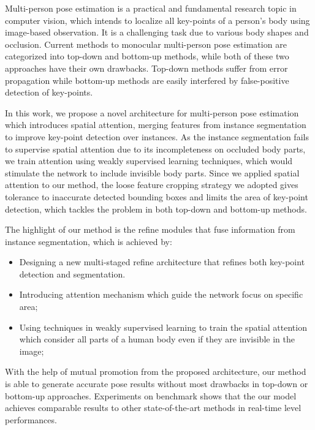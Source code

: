 \begin{eabstract}
Multi-person pose estimation is a practical and fundamental research topic in computer vision, which intends to localize all key-points of a person's body using image-based observation. It is a challenging task due to various body shapes and occlusion. Current methods to monocular multi-person pose estimation are categorized into top-down and bottom-up methods, while both of these two approaches have their own drawbacks. Top-down methods suffer from error propagation while bottom-up methods are easily interfered by false-positive detection of key-points.

In this work, we propose a novel architecture for multi-person pose estimation which introduces spatial attention, merging features from instance segmentation to improve key-point detection over instances. As the instance segmentation fails to supervise spatial attention due to its incompleteness on occluded body parts, we train attention using weakly supervised learning techniques, which would stimulate the network to include invisible body parts. Since we applied spatial attention to our method, the loose feature cropping strategy we adopted gives tolerance to inaccurate detected bounding boxes and limits the area of key-point detection, which tackles the problem in both top-down and bottom-up methods.

The highlight of our method is the refine modules that fuse information from instance segmentation, which is achieved by:
\begin{itemize}
	\item Designing a new multi-staged refine architecture that refines both key-point detection and segmentation.
	\item Introducing attention mechanism which guide the network focus on specific area;
	\item Using techniques in weakly supervised learning to train the spatial attention which consider all parts of a human body even if they are invisible in the image;
\end{itemize}

With the help of mutual promotion from the proposed architecture, our method is able to generate accurate pose results without most drawbacks in top-down or bottom-up approaches. Experiments on benchmark shows that the our model achieves comparable results to other state-of-the-art methods in real-time level performances.
\end{eabstract}

